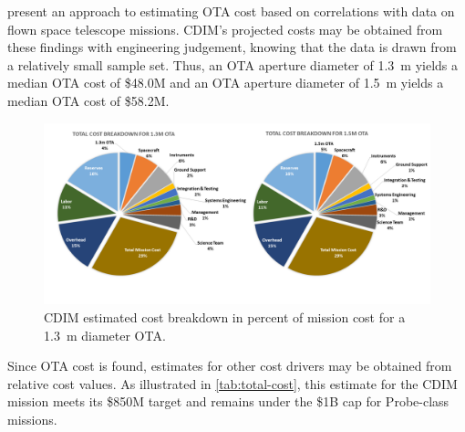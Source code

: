 \documentclass{ws-jai}
\begin{document}
\citeauthor{stahl2013} present an approach to estimating OTA cost based on correlations with data on flown space telescope missions.
CDIM's projected costs may be obtained from these findings with engineering judgement, knowing that the data is drawn from a relatively small sample set.
Thus, an OTA aperture diameter of \SI{1.3}{\meter} yields a median OTA cost of \$48.0M and an OTA aperture diameter of \SI{1.5}{\meter} yields a median OTA cost of \$58.2M.
\begin{figure}[!htp]
  \centering
    \centering
    \includegraphics[width=\linewidth]{figs/cost-breakdown-pie.png}
    \caption{CDIM estimated cost breakdown in percent of mission cost for a \SI{1.3}{\meter} diameter OTA.\@
\label{fig:cost-breakdown}
}
\end{figure}

Since OTA cost is found, estimates for other cost drivers may be obtained from relative cost values.
As illustrated in \autoref{tab:total-cost}, this estimate for the CDIM mission meets its \$850M target and remains under the \$1B cap for Probe-class missions.
\end{document}

